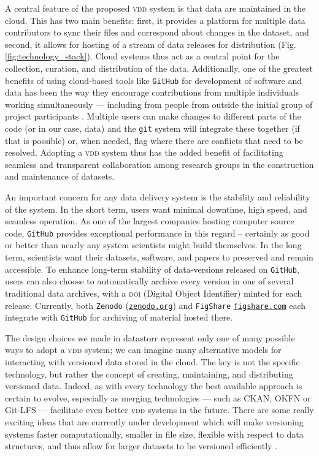 \documentclass[english]{article}
\newcommand{\smurl}[1]{{\footnotesize\href{https://#1}{\nolinkurl{#1}}}}
\begin{document}
A central feature of the proposed  \textsc{vdd} system is that data are maintained in the cloud. This has two main benefits: first, it provides a platform for multiple data contributors to sync their files and correspond about changes in the dataset, and second, it allows for hosting of a stream of data releases for distribution (Fig. \ref{fig:technology_stack}). Cloud systems thus act as a central point for the collection, curation, and distribution of the data. Additionally, one of the greatest benefits of using cloud-based tools like  \texttt{GitHub} for development of software and data has been the way they encourage contributions from multiple individuals working simultaneously --- including from people from outside the initial group of project participants \cite{Rogers-2013, Perkel-2016}. Multiple users can make changes to different parts of the code (or in our case, data) and the \texttt{git} system will integrate these together (if that is possible) or, when needed, flag where there are conflicts that need to be resolved. Adopting a \textsc{vdd} system thus has the added benefit of facilitating seamless and transparent collaboration among research groups in the construction and maintenance of datasets.

An important concern for any data delivery system is the stability and reliability of the system. In the short term, users want minimal downtime, high speed, and seamless operation. As one of the largest companies hosting computer source code, \texttt{GitHub} provides exceptional performance in this regard -- certainly as good or better than nearly any system scientists might build themselves. In the long term, scientists want their datasets, software, and papers to preserved and remain accessible. To enhance long-term stability of data-versions released on \texttt{GitHub}, users can also choose to automatically archive every version in one of several traditional data archives, with a \textsc{doi} (Digital Object Identifier) minted for each release. Currently, both \texttt{Zenodo} (\smurl{zenodo.org}) and  \texttt{FigShare} \smurl{figshare.com} each integrate with \texttt{GitHub} for archiving of material hosted there.

The design choices we made in datastorr represent only one of many possible ways to adopt a \textsc{vdd} system; we can imagine many alternative models for interacting with versioned data stored in the cloud. The key is not the specific technology, but rather the concept of creating, maintaining, and distributing versioned data. Indeed, as with every technology the best available approach is certain to evolve, especially as merging technologies --- such as CKAN, OKFN or Git-LFS --- facilitate even better \textsc{vdd} systems in the future.  There are some really exciting ideas that are currently under development which will make versioning systems faster computationally, smaller in file size, flexible with respect to data structures, and thus allow for larger datasets to be versioned efficiently \cite{Fli, Dat}. 
\end{document}
